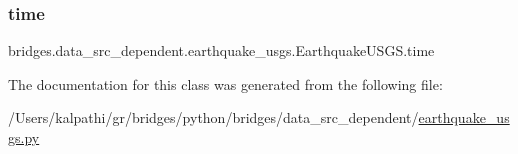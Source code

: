\subsubsection{\texorpdfstring{time}{time}}
{\footnotesize\ttfamily bridges.\+data\+\_\+src\+\_\+dependent.\+earthquake\+\_\+usgs.\+Earthquake\+U\+S\+G\+S.\+time}



The documentation for this class was generated from the following file\+:\begin{DoxyCompactItemize}
\item 
/\+Users/kalpathi/gr/bridges/python/bridges/data\+\_\+src\+\_\+dependent/\mbox{\hyperlink{earthquake__usgs_8py}{earthquake\+\_\+usgs.\+py}}\end{DoxyCompactItemize}
